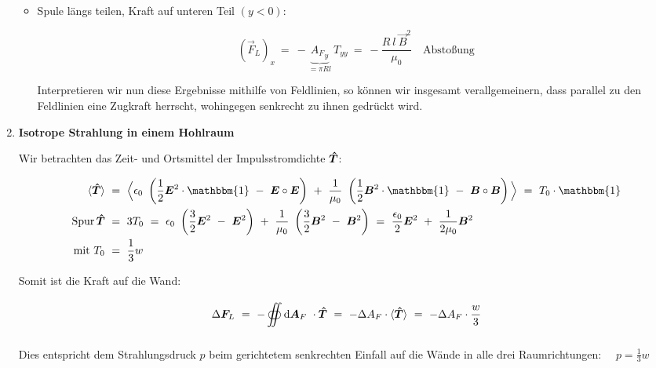 \begin{enumerate}
\begin{itemize}
\item Spule längs teilen, Kraft auf unteren Teil $(y<0)$:

\begin{equation*}
(\vec{F}_L)_x \ = \ -\underbrace{{A_F}_y}_{=\pi R l} \ T_{yy} \ = \ -\frac{R \ l \ \vec{B}^2}{\mu_0} \quad \text{Abstoßung}
\end{equation*}

Interpretieren wir nun diese Ergebnisse mithilfe von Feldlinien, so können wir insgesamt verallgemeinern, dass parallel zu den Feldlinien eine Zugkraft herrscht, wohingegen senkrecht zu ihnen gedrückt wird. 
\end{itemize}

\item \textbf{ Isotrope Strahlung in einem Hohlraum}

Wir betrachten das Zeit- und Ortsmittel der Impulsstromdichte $\bm{\hat{T}}$:

\begin{align*}
\langle\tens{T}\rangle \ &= \ \Big\langle \epsilon_0 \ \left(\frac{1}{2}\vec{E}^2\cdot\mathbbm{1} \ - \ \vec{E}\circ\vec{E}\right) \ + \ \frac{1}{\mu_0} \ \left(\frac{1}{2}\vec{B}^2\cdot\mathbbm{1} \ - \ \vec{B}\circ\vec{B}\right) \Big\rangle \ = \ T_0 \cdot \mathbbm{1}\\
\operatorname{Spur} \tens{T} \ &= \ 3 T_0 \ = \ \epsilon_0 \ \left(\frac{3}{2}\vec{E}^2 \ - \ \vec{E}^2\right) \ + \ \frac{1}{\mu_0} \ \left(\frac{3}{2}\vec{B}^2 \ - \ \vec{B}^2\right) \ = \ \frac{\epsilon_0}{2}\vec{E}^2 \ + \ \frac{1}{2\mu_0}\vec{B}^2 \\
\text{mit } T_0 \ &= \ \frac{1}{3} w 
\end{align*}

\newpage
Somit ist die Kraft auf die Wand:

\begin{equation*}
\Delta\vec{F}_L \ = \ -\Oiint{}{}{\vec{A}_F} \cdot\tens{T} \ = \ - \Delta A_F \cdot \langle\tens{T} \rangle \ = \ - \Delta A_F \cdot \frac{w}{3}
\end{equation*}

Dies entspricht dem Strahlungsdruck $p$ beim gerichtetem senkrechten Einfall auf die Wände in alle drei Raumrichtungen: $\quad p = \frac{1}{3}w$
\end{enumerate}